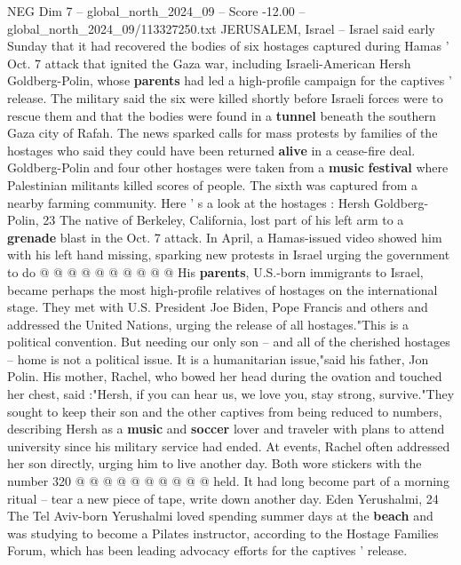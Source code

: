 \begin{textsample}{NEG Dim 7 – global\_north\_2024\_09 – Score -12.00 – global\_north\_2024\_09/113327250.txt}  \label{ex:f7_neg_008}
JERUSALEM, Israel -- Israel said early Sunday that it had recovered the bodies of six hostages captured during Hamas ' Oct. 7 attack that ignited the Gaza war, including Israeli-American Hersh Goldberg-Polin, whose \textbf{parents} had led a high-profile campaign for the captives ' release.
The military said the six were killed shortly before Israeli forces were to rescue them and that the bodies were found in a \textbf{tunnel} beneath the southern Gaza city of Rafah.
The news sparked calls for mass protests by families of the hostages who said they could have been returned \textbf{alive} in a cease-fire deal.
Goldberg-Polin and four other hostages were taken from a \textbf{music} \textbf{festival} where Palestinian militants killed scores of people.
The sixth was captured from a nearby farming community.
Here ' s a look at the hostages : Hersh Goldberg-Polin, 23 The native of Berkeley, California, lost part of his left arm to a \textbf{grenade} blast in the Oct. 7 attack.
In April, a Hamas-issued video showed him with his left hand missing, sparking new protests in Israel urging the government to do @ @ @ @ @ @ @ @ @ @ His \textbf{parents}, U.S.-born immigrants to Israel, became perhaps the most high-profile relatives of hostages on the international stage.
They met with U.S.
President Joe Biden, Pope Francis and others and addressed the United Nations, urging the release of all hostages."This is a political convention.
But needing our only son -- and all of the cherished hostages -- home is not a political issue.
It is a humanitarian issue,"said his father, Jon Polin.
His mother, Rachel, who bowed her head during the ovation and touched her chest, said :"Hersh, if you can hear us, we love you, stay strong, survive."They sought to keep their son and the other captives from being reduced to numbers, describing Hersh as a \textbf{music} and \textbf{soccer} lover and traveler with plans to attend university since his military service had ended.
At events, Rachel often addressed her son directly, urging him to live another day.
Both wore stickers with the number 320 @ @ @ @ @ @ @ @ @ @ held.
It had long become part of a morning ritual -- tear a new piece of tape, write down another day.
Eden Yerushalmi, 24 The Tel Aviv-born Yerushalmi loved spending summer days at the \textbf{beach} and was studying to become a Pilates instructor, according to the Hostage Families Forum, which has been leading advocacy efforts for the captives ' release.

\end{textsample}

